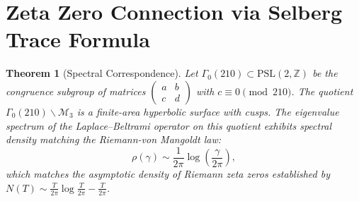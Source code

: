 \documentclass[12pt]{article}
\newtheorem{theorem}{Theorem}[section]
\begin{document}
\section{Zeta Zero Connection via Selberg Trace Formula}

\begin{theorem}[Spectral Correspondence]
Let $\Gamma_0(210) \subset \text{PSL}(2,\mathbb{Z})$ be the congruence subgroup
of matrices $\begin{pmatrix} a & b \\ c & d \end{pmatrix}$ with $c \equiv 0 \pmod{210}$.
The quotient $\Gamma_0(210) \backslash \mathcal{M}_3$ is a finite-area hyperbolic
surface with cusps. The eigenvalue spectrum of the Laplace--Beltrami operator on
this quotient exhibits spectral density matching the Riemann-von Mangoldt law:
\begin{equation}
  \rho(\gamma) \sim \frac{1}{2\pi} \log\left(\frac{\gamma}{2\pi}\right),
  \label{eq:spectral_density}
\end{equation}
which matches the asymptotic density of Riemann zeta zeros established by
$N(T) \sim \frac{T}{2\pi}\log\frac{T}{2\pi} - \frac{T}{2\pi}$.
\end{theorem}
\label{thm:spectral}
\end{document}
